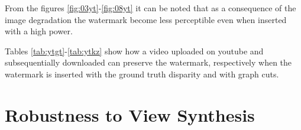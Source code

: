 From the figures \ref{fig:03yt}-\ref{fig:08yt} it can be noted that as a consequence of the image degradation the watermark become less perceptible even when inserted with a high power. 

Tables \ref{tab:ytgt}-\ref{tab:ytkz} show how a video uploaded on youtube and subsequentially downloaded can preserve the watermark, respectively when the watermark is inserted with the ground truth disparity and with graph cuts.\newline
 
 
 \begin{table}[htbp]

  \begin{center}
  \caption{Detection statistic for a downloaded video marked with ground truth disparity\label{tab:ytgt}}
  \end{center}
  \end{table}
 
\begin{table}[htbp]
 
 \begin{center}
 \caption{Detection statistic for a downloaded video marked with graph cuts disparity\label{tab:ytkz}}
 \end{center}
 \end{table}
 \clearpage

\section{Robustness to View Synthesis}
 
